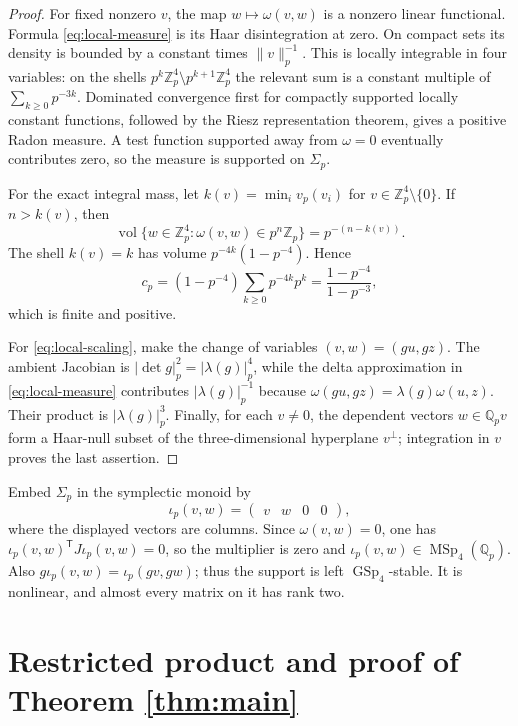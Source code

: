\documentclass[11pt]{article}
\newcommand{\Qp}{\mathbb Q_p}
\newcommand{\Zp}{\mathbb Z_p}
\newcommand{\GSp}{\operatorname{GSp}_4}
\newcommand{\MSp}{\operatorname{MSp}_4}
\newcommand{\vol}{\operatorname{vol}}
\begin{document}
\begin{proof}
For fixed nonzero $v$, the map $w\mapsto\omega(v,w)$ is a nonzero linear
functional.  Formula \eqref{eq:local-measure} is its Haar disintegration at
zero.  On compact sets its density is bounded by a constant times
$\|v\|_p^{-1}$.  This is locally integrable in four variables: on the shells
$p^k\Zp^4\setminus p^{k+1}\Zp^4$ the relevant sum is a constant multiple of
$\sum_{k\geq0}p^{-3k}$.  Dominated convergence first for compactly supported
locally constant functions, followed by the Riesz representation theorem,
gives a positive Radon measure.  A test function supported away from
$\omega=0$ eventually contributes zero, so the measure is supported on
$\Sigma_p$.

For the exact integral mass, let
$k(v)=\min_i v_p(v_i)$ for $v\in\Zp^4\setminus\{0\}$.  If $n>k(v)$, then
\[
 \vol\{w\in\Zp^4:\omega(v,w)\in p^n\Zp\}=p^{-(n-k(v))}.
\]
The shell $k(v)=k$ has volume $p^{-4k}(1-p^{-4})$.  Hence
\[
 c_p=(1-p^{-4})\sum_{k\geq0}p^{-4k}p^k
     =\frac{1-p^{-4}}{1-p^{-3}},
\]
which is finite and positive.

For \eqref{eq:local-scaling}, make the change of variables
$(v,w)=(gu,gz)$.  The ambient Jacobian is
$|\det g|_p^2=|\lambda(g)|_p^4$, while the delta approximation in
\eqref{eq:local-measure} contributes $|\lambda(g)|_p^{-1}$ because
$\omega(gu,gz)=\lambda(g)\omega(u,z)$.  Their product is
$|\lambda(g)|_p^3$.  Finally, for each $v\ne0$, the dependent vectors
$w\in\Qp v$ form a Haar-null subset of the three-dimensional hyperplane
$v^\perp$; integration in $v$ proves the last assertion.
\end{proof}

Embed $\Sigma_p$ in the symplectic monoid by
\begin{equation}\label{eq:embedding}
  \iota_p(v,w)=\begin{pmatrix} v&w&0&0\end{pmatrix},
\end{equation}
where the displayed vectors are columns.  Since $\omega(v,w)=0$, one has
$\iota_p(v,w)^{\mathsf T}J\iota_p(v,w)=0$, so the multiplier is zero and
$\iota_p(v,w)\in\MSp(\Qp)$.  Also
$g\iota_p(v,w)=\iota_p(gv,gw)$; thus the support is left $\GSp$-stable.
It is nonlinear, and almost every matrix on it has rank two.

\section{Restricted product and proof of Theorem \ref{thm:main}}
\end{document}
